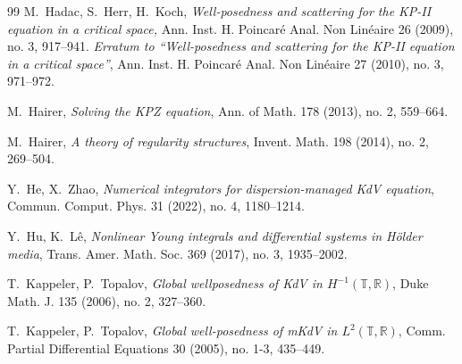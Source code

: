 \documentclass[letterpaper, 11pt,  reqno]{amsart}
\newcommand{\1}{\hspace{0.5mm}\text{I}\hspace{0.5mm}}
\newcommand{\R}{\mathbb{R}}
\newcommand{\T}{\mathbb{T}}
\numberwithin{equation}{section}
\numberwithin{theorem}{section}
\begin{document}
\begin{thebibliography}{99}
M.~Hadac, S.~Herr, H.~Koch,
{\it Well-posedness and scattering for the KP-II equation in a critical space,}
 Ann. Inst. H. Poincar\'e Anal. Non Lin\'eaire  26 (2009), no. 3, 917--941.
{\it  Erratum to ``Well-posedness and scattering for the KP-II equation in a critical space''},
Ann. Inst. H. Poincar\'e Anal. Non Lin\'eaire 27 (2010), no. 3, 971--972.


%
%


M.~Hairer,
{\it Solving the KPZ equation},
Ann. of Math.  178 (2013), no. 2, 559--664.



M.~Hairer,
{\it A theory of regularity structures},
Invent. Math. 198 (2014), no. 2, 269--504.

%
%
%


Y.~He, X.~Zhao,
{\it Numerical integrators for dispersion-managed KdV equation}, 
Commun. Comput. Phys. 31 (2022), no. 4, 1180--1214. 


Y.~Hu, K.~L\^e, 
{\it Nonlinear Young integrals and differential systems in H\"older media},
 Trans. Amer. Math. Soc. 369 (2017), no. 3, 1935--2002. 


%
%
%
%
%
%
%





T.~Kappeler, P.~Topalov,
{\it Global wellposedness of KdV in $H^{-1}(\T, \R)$},
Duke Math. J. 135 (2006), no. 2, 327--360.


T.~Kappeler, P.~Topalov,
{\it Global well-posedness of mKdV in $L^2(\T,\R)$}, 
Comm. Partial Differential Equations 30 (2005), no. 1-3, 435--449. 



\end{thebibliography}
\end{document}
